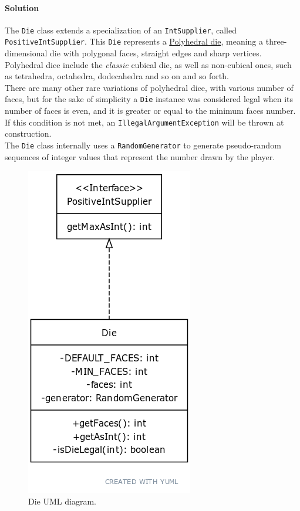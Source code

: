 \documentclass[12pt, a4paper]{report}
\theoremstyle{definition}
\begin{document}
    \paragraph{Solution}
    The \verb|Die| class extends a specialization of an \verb|IntSupplier|, called \verb|PositiveIntSupplier|.
    This \verb|Die| represents a \href{https://en.wikipedia.org/wiki/Dice#Polyhedral_dice}{Polyhedral die}, meaning a
    three-dimensional die with polygonal faces, straight edges and sharp vertices.\\
    Polyhedral dice include the \textit{classic} cubical die, as well as non-cubical ones, such as tetrahedra, octahedra, dodecahedra
    and so on and so forth.\\
    There are many other rare variations of polyhedral dice, with various number of faces, but for the sake of simplicity
    a \verb|Die| instance was considered legal when its number of faces is even, and it is greater or equal to the minimum faces number.\\
    If this condition is not met, an \verb|IllegalArgumentException| will be thrown at construction.\\
    The \verb|Die| class internally uses a \verb|RandomGenerator| to generate pseudo-random sequences of integer values that represent
    the number drawn by the player.
    
    \begin{figure}[h]
    \centering{}
    \caption{Die UML diagram.}
    \includegraphics[scale=0.5]{die_uml}
    \end{figure}
\end{document}
